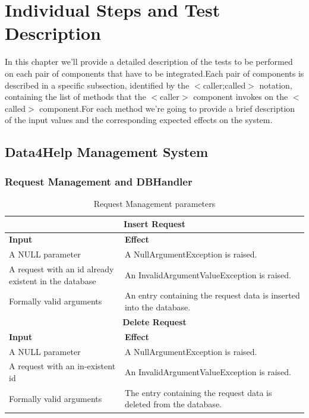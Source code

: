\documentclass[a4paper, hidelinks, 12pt]{report}
\begin{document}
	\chapter{Individual Steps and Test Description}
	In this chapter we'll provide a detailed description of the tests to be performed on each pair of components that have to be integrated.Each pair of components is described in a specific subsection, identified by the $<$caller;called$>$ notation, containing the list of methods that the $<$caller$>$ component invokes on the $<$called$>$ component.For each method we're going to provide a brief description of the input values and the corresponding expected effects on the system.

	\section{ Data4Help Management System}
	\subsection{Request Management and DBHandler}

	\begin{table}[h!]
		\centering
		\begin{tabular}{|p{6cm}|p{9cm}|}
			\hline\hline
			\multicolumn{2}{c}{\textbf{Insert Request}} \\
			\hline
			\textbf{Input} & \textbf{Effect} \\ [0.5ex]
			\hline
			A NULL parameter & A NullArgumentException is raised.  \\
			\hline
			A request with an id already existent in the database & An InvalidArgumentValueException is raised.\\
			\hline
			Formally valid arguments & An entry containing the request data is inserted into the database.\\
			\hline\hline
			\multicolumn{2}{c}{\textbf{Delete Request}} \\
			\hline
			\textbf{Input} & \textbf{Effect} \\ [0.5ex]
			\hline
			A NULL parameter & A NullArgumentException is raised.  \\
			\hline
			A request with an in-existent id & An InvalidArgumentValueException is raised.\\
			\hline
			Formally valid arguments & The entry containing the request data is deleted from the database.\\
			\hline
		\end{tabular}
		\caption{Request Management parameters}
		
		\label{fig:Request Management parameters}
	\end{table}
	
\end{document}

